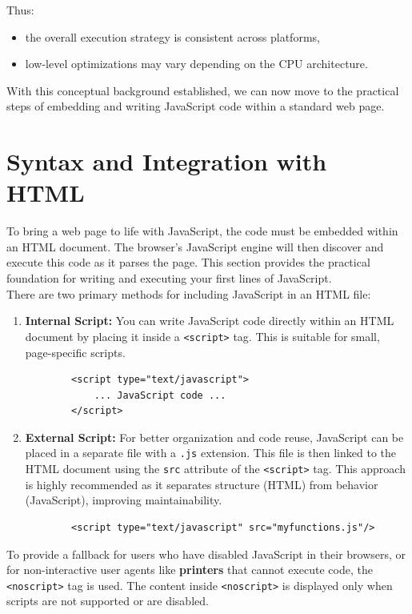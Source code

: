 \documentclass{scrbook}
\begin{document}
Thus:
\begin{itemize}
    \item the overall execution strategy is consistent across platforms,
    \item low-level optimizations may vary depending on the CPU architecture.
\end{itemize}

With this conceptual background established, we can now move to the practical steps of embedding and writing JavaScript code within a standard web page.

\chapter{Syntax and Integration with HTML}

To bring a web page to life with JavaScript, the code must be embedded within an HTML document. The browser's JavaScript engine will then discover and execute this code as it parses the page. This section provides the practical foundation for writing and executing your first lines of JavaScript.\\

There are two primary methods for including JavaScript in an HTML file:

\begin{enumerate}
    \item
    \textbf{Internal Script:} You can write JavaScript code directly within an HTML document by placing it inside a \texttt{<script>} tag. This is suitable for small, page-specific scripts.
    \begin{lstlisting}
        <script type="text/javascript">
            ... JavaScript code ...
        </script>
    \end{lstlisting}
    
    \item
    \textbf{External Script:} For better organization and code reuse, JavaScript can be placed in a separate file with a \texttt{.js} extension. This file is then linked to the HTML document using the \texttt{src} attribute of the \texttt{<script>} tag. This approach is highly recommended as it separates structure (HTML) from behavior (JavaScript), improving maintainability.
    \begin{lstlisting}
        <script type="text/javascript" src="myfunctions.js"/>
    \end{lstlisting}
\end{enumerate}

To provide a fallback for users who have disabled JavaScript in their browsers, or for non-interactive user agents like \textbf{printers} that cannot execute code, the \texttt{<noscript>} tag is used. The content inside \texttt{<noscript>} is displayed only when scripts are not supported or are disabled.
\end{document}
